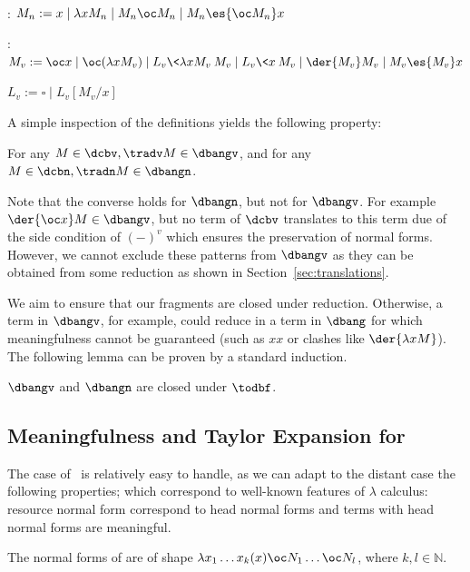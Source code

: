 \begin{definition}\

	\dbangn : $M_n := x \mid \lambda x M_n \mid M_n \oc  M_n \mid M_n\es{\oc
	M_n}x$
	
	\dbangv : 
		$M_v := \oc x \mid \oc(\lambda x M_v) 
		\mid L_v\<\lambda x M_v\> M_v \mid L_v\<x\> M_v \mid \der{M_v}M_v \mid M_v\es{M_v}x $

	$L_v:=\square\mid L_v[M_v/x]$

\end{definition}

A simple inspection of the definitions yields the following property:
\begin{lemma}\label{lem:trad_fragments}
	For any $M\in\dcbv, \tradv M\in\dbangv$, and for any $M\in\dcbn, \tradn M\in\dbangn$.
\end{lemma}

Note that the converse holds for $\dbangn$, but not for $\dbangv$. For example
$\der{\oc x}M\in\dbangv$, but no term of $\dcbv$ translates to
this term due of the side condition of $(-)^v$ which ensures the preservation of
normal forms. However, we cannot
exclude these patterns from $\dbangv$ as they can be obtained from some reduction
as shown in Section~\ref{sec:translations}.

We aim to ensure that our fragments are closed under reduction. Otherwise,
a term in $\dbangv$, for example, could reduce in a term in $\dbang$ for which
meaningfulness cannot be guaranteed (such as $xx$ or clashes like
$\der{\lambda xM}$). The following lemma can be proven by a standard induction.
\begin{lemma}
	$\dbangv$ and $\dbangn$ are closed under $\todbf$.
\end{lemma}

\subsection{Meaningfulness and Taylor Expansion for \dcbn}

The case of \dcbn\ is relatively easy to handle, as we can adapt to the distant
case the following properties; which correspond to well-known features of $\lambda$
calculus: resource normal form correspond to head normal forms and terms with head normal
forms are meaningful.

\begin{lemma}
	\label{lemma:dbangn-nf-shape}
	The normal forms of \dbangn{} are of shape $\lambda x_1\dots x_k (x) \oc N_1\dots \oc
	N_l$, where $k,l\in\mathbb N$.
\end{lemma}

